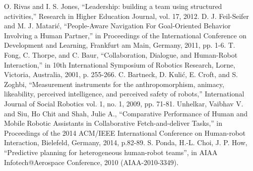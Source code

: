 \documentclass{acm_proc_article-sp}
\begin{document}
\begin{thebibliography}{}
 O. Rivas and I. S. Jones, ``Leadership: building a team using structured activities,'' Research in Higher Education Journal, vol. 17, 2012.
 D. J. Feil-Seifer and M. J. Matari\'{c}, ``People-Aware Navigation For Goal-Oriented Behavior Involving a Human Partner,'' in Proceedings of the International Conference on Development and Learning, Frankfurt am Main, Germany, 2011, pp. 1-6.
 T. Fong, C. Thorpe, and C. Baur, ``Collaboration, Dialogue, and Human-Robot Interaction,'' in 10th International Symposium of Robotics Research, Lorne, Victoria, Australia, 2001, p. 255-266.
 C. Bartneck, D. Kuli\'{c}, E. Croft, and S. Zoghbi, ``Measurement instruments for the anthropomorphism, animacy, likeability, perceived intelligence, and perceived safety of robots,'' International Journal of Social Robotics vol. 1, no. 1, 2009, pp. 71-81.
 Unhelkar, Vaibhav V. and Siu, Ho Chit and Shah, Julie A., ``Comparative Performance of Human and Mobile Robotic Assistants in Collaborative Fetch-and-deliver Tasks,'' in Proceedings of the 2014 ACM/IEEE International Conference on Human-robot Interaction, Bielefeld, Germany, 2014, p.82-89.
 S. Ponda, H.-L. Choi, J. P. How, ``Predictive planning for heterogeneous human-robot teams'', in AIAA Infotech@Aerospace Conference, 2010 (AIAA-2010-3349).

\end{thebibliography}

\balancecolumns
\end{document}
